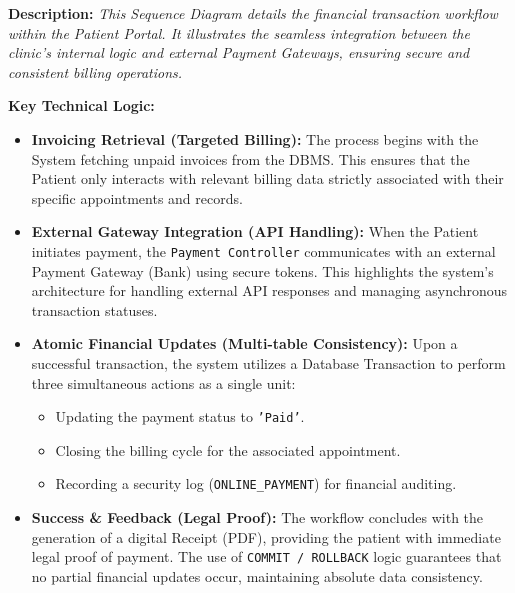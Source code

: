 \textbf{Description:} \textit{This Sequence Diagram details the financial transaction
	workflow within the Patient Portal. It illustrates the seamless integration between the
	clinic's internal logic and external Payment Gateways, ensuring secure and consistent
	billing operations.}

\medskip
\textbf{Key Technical Logic:}

\begin{itemize}
	\item \textbf{Invoicing Retrieval (Targeted Billing):} The process begins with the
	System fetching unpaid invoices from the DBMS. This ensures that the Patient
	only interacts with relevant billing data strictly associated with their specific
	appointments and records.
	
	\item \textbf{External Gateway Integration (API Handling):} When the Patient
	initiates payment, the \texttt{Payment Controller} communicates with an
	external Payment Gateway (Bank) using secure tokens. This highlights the
	system's architecture for handling external API responses and managing
	asynchronous transaction statuses.
	
	\item \textbf{Atomic Financial Updates (Multi-table Consistency):} Upon a
	successful transaction, the system utilizes a Database Transaction to
	perform three simultaneous actions as a single unit:
	\begin{itemize}
		\item Updating the payment status to \texttt{'Paid'}.
		\item Closing the billing cycle for the associated appointment.
		\item Recording a security log (\texttt{ONLINE\_PAYMENT}) for financial
		auditing.
	\end{itemize}
	
	\item \textbf{Success \& Feedback (Legal Proof):} The workflow concludes with
	the generation of a digital Receipt (PDF), providing the patient with
	immediate legal proof of payment. The use of \texttt{COMMIT / ROLLBACK}
	logic guarantees that no partial financial updates occur, maintaining absolute
	data consistency.
\end{itemize}

\newpage


